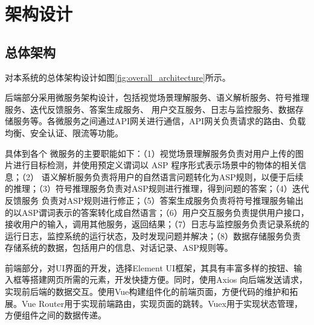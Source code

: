 \section{架构设计}
\subsection{总体架构}
对本系统的总体架构设计如图\ref{fig:overall_architecture}所示。

后端部分采用微服务架构设计，包括视觉场景理解服务、语义解析服务、符号推理服务、迭代反馈服务、答案生成服务、
用户交互服务、日志与监控服务、数据存储服务等。各微服务之间通过API网关进行通信，API网关负责请求的路由、负载均衡、安全认证、限流等功能。

具体到各个
微服务的主要职能如下：（1）视觉场景理解服务负责对用户上传的图片进行目标检测，并使用预定义谓词以 ASP 程序形式表示场景中的物体的相关信息；（2）
语义解析服务负责将用户的自然语言问题转化为ASP规则，以便于后续的推理；（3）符号推理服务负责对ASP规则进行推理，得到问题的答案；（4）迭代反馈服务
负责对ASP规则进行修正；（5）答案生成服务负责将符号推理服务输出的以ASP谓词表示的答案转化成自然语言；（6）用户交互服务负责提供用户接口，
接收用户的输入，调用其他服务，返回结果；（7）日志与监控服务负责记录系统的运行日志，监控系统的运行状态，及时发现问题并解决；（8）数据存储服务负责
存储系统的数据，包括用户的信息、对话记录、ASP规则等。

前端部分，对UI界面的开发，选择Element UI框架，其具有丰富多样的按钮、输入框等搭建网页所需的元素，开发快捷方便。同时，使用Axios
向后端发送请求，实现前后端的数据交互。使用Vue构建组件化的前端页面，方便代码的维护和拓展。Vue Router用于实现前端路由，实现页面的跳转。Vuex用于实现状态管理，方便组件之间的数据传递。

